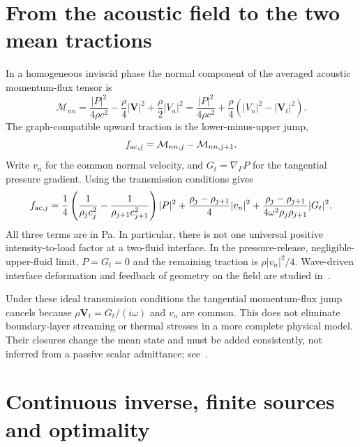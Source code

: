 \section{From the acoustic field to the two mean tractions}
In a homogeneous inviscid phase the normal component of the averaged
acoustic momentum-flux tensor is
\begin{equation}\label{eq:momentum-flux}
 \mathcal M_{nn}=\frac{|P|^2}{4\rho c^2}
 -\frac{\rho}{4}|\mathbf V|^2+\frac{\rho}{2}|V_n|^2
 =\frac{|P|^2}{4\rho c^2}+\frac{\rho}{4}(|V_n|^2-|\mathbf V_t|^2).
\end{equation}
The graph-compatible upward traction is the lower-minus-upper jump,
\begin{equation}\label{eq:traction-jump}
 f_{{\rm ac},j}=\mathcal M_{nn,j}-\mathcal M_{nn,j+1}.
\end{equation}
Write $v_n$ for the common normal velocity, and $G_t=\nabla_\Gamma P$ for
the tangential pressure gradient. Using the transmission conditions gives
\begin{equation}\label{eq:traction-reduced}
 f_{{\rm ac},j}=\frac14\left(\frac1{\rho_jc_j^2}-\frac1{\rho_{j+1}c_{j+1}^2}\right)|P|^2
 +\frac{\rho_j-\rho_{j+1}}4|v_n|^2
 +\frac{\rho_j-\rho_{j+1}}{4\omega^2\rho_j\rho_{j+1}}|G_t|^2.
\end{equation}
All three terms are in Pa. In particular, there is not one universal
positive intensity-to-load factor at a two-fluid interface. In the
pressure-release, negligible-upper-fluid limit, $P=G_t=0$ and the remaining
traction is $\rho|v_n|^2/4$. Wave-driven interface deformation and feedback
of geometry on the field are studied in~\cite{chesneau2022}.

Under these ideal transmission conditions the tangential momentum-flux
jump cancels because $\rho\mathbf V_t=G_t/(i\omega)$ and $v_n$ are common.
This does not eliminate boundary-layer streaming or thermal stresses in a
more complete physical model. Their closures change the mean state and
must be added consistently, not inferred from a passive scalar admittance;
see~\cite{bach2018,jorgensen2021}.

\section{Continuous inverse, finite sources and optimality}
